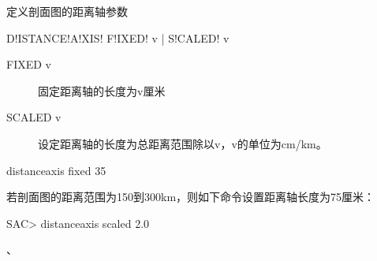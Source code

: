 \label{sss:distanceaxis}

定义剖面图的距离轴参数

\begin{SACSTX}
D!ISTANCE!A!XIS! F!IXED! v | S!CALED! v
\end{SACSTX}

\begin{description}
\item [FIXED v] 固定距离轴的长度为v厘米
\item [SCALED v] 设定距离轴的长度为总距离范围除以v，v的单位为cm/km。
\end{description}

\begin{SACDFT}
distanceaxis fixed 35
\end{SACDFT}

若剖面图的距离范围为150到300km，则如下命令设置距离轴长度为75厘米：
\begin{SACCode}
SAC> distanceaxis scaled 2.0
\end{SACCode}

、
